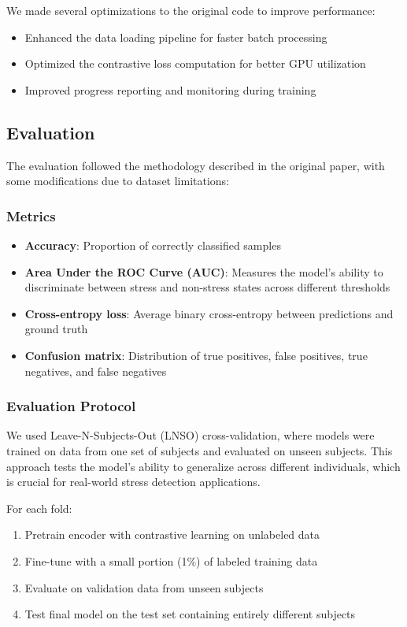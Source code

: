 \documentclass[10pt,letterpaper,twocolumn]{article}
\begin{document}
We made several optimizations to the original code to improve performance:
\begin{itemize}
    \item Enhanced the data loading pipeline for faster batch processing
    \item Optimized the contrastive loss computation for better GPU utilization
    \item Improved progress reporting and monitoring during training
\end{itemize}

\subsection{Evaluation}

The evaluation followed the methodology described in the original paper, with some modifications due to dataset limitations:

\subsubsection{Metrics}

\begin{itemize}
    \item \textbf{Accuracy}: Proportion of correctly classified samples
    \item \textbf{Area Under the ROC Curve (AUC)}: Measures the model's ability to discriminate between stress and non-stress states across different thresholds
    \item \textbf{Cross-entropy loss}: Average binary cross-entropy between predictions and ground truth
    \item \textbf{Confusion matrix}: Distribution of true positives, false positives, true negatives, and false negatives
\end{itemize}

\subsubsection{Evaluation Protocol}

We used Leave-N-Subjects-Out (LNSO) cross-validation, where models were trained on data from one set of subjects and evaluated on unseen subjects. This approach tests the model's ability to generalize across different individuals, which is crucial for real-world stress detection applications.

For each fold:
\begin{enumerate}
    \item Pretrain encoder with contrastive learning on unlabeled data
    \item Fine-tune with a small portion (1\%) of labeled training data
    \item Evaluate on validation data from unseen subjects
    \item Test final model on the test set containing entirely different subjects
\end{enumerate}
\end{document}
